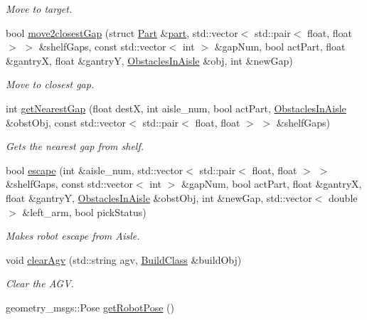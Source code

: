 \begin{DoxyCompactItemize}
\begin{DoxyCompactList}\small\item\em Move to target. \end{DoxyCompactList}\item 
bool \hyperlink{classGantryControl_aa6ba7baf102ac7e39d68b2ae2492f9a5}{move2closest\+Gap} (struct \hyperlink{structPart}{Part} \&\hyperlink{utils_8h_a67ee3a5b9091664130eca8efc8b97ab9}{part}, std\+::vector$<$ std\+::pair$<$ float, float $>$ $>$ \&shelf\+Gaps, const std\+::vector$<$ int $>$ \&gap\+Num, bool act\+Part, float \&gantryX, float \&gantryY, \hyperlink{classObstaclesInAisle}{Obstacles\+In\+Aisle} \&obj, int \&new\+Gap)
\begin{DoxyCompactList}\small\item\em Move to closest gap. \end{DoxyCompactList}\item 
int \hyperlink{classGantryControl_ab475e912ab1ea0d13efc10078695102e}{get\+Nearest\+Gap} (float destX, int aisle\+\_\+num, bool act\+Part, \hyperlink{classObstaclesInAisle}{Obstacles\+In\+Aisle} \&obst\+Obj, const std\+::vector$<$ std\+::pair$<$ float, float $>$ $>$ \&shelf\+Gaps)
\begin{DoxyCompactList}\small\item\em Gets the nearest gap from shelf. \end{DoxyCompactList}\item 
bool \hyperlink{classGantryControl_aa014dd433af4fc580d38639c6353e7b8}{escape} (int \&aisle\+\_\+num, std\+::vector$<$ std\+::pair$<$ float, float $>$ $>$ \&shelf\+Gaps, const std\+::vector$<$ int $>$ \&gap\+Num, bool act\+Part, float \&gantryX, float \&gantryY, \hyperlink{classObstaclesInAisle}{Obstacles\+In\+Aisle} \&obst\+Obj, int \&new\+Gap, std\+::vector$<$ double $>$ \&left\+\_\+arm, bool pick\+Status)
\begin{DoxyCompactList}\small\item\em Makes robot escape from Aisle. \end{DoxyCompactList}\item 
void \hyperlink{classGantryControl_ad7df230473058728ad07804a3d6d1b4c}{clear\+Agv} (std\+::string agv, \hyperlink{classBuildClass}{Build\+Class} \&build\+Obj)
\begin{DoxyCompactList}\small\item\em Clear the A\+GV. \end{DoxyCompactList}\item 
geometry\+\_\+msgs\+::\+Pose \hyperlink{classGantryControl_aefa12231efd7960bc201638f832d9478}{get\+Robot\+Pose} ()

\end{DoxyCompactItemize}
